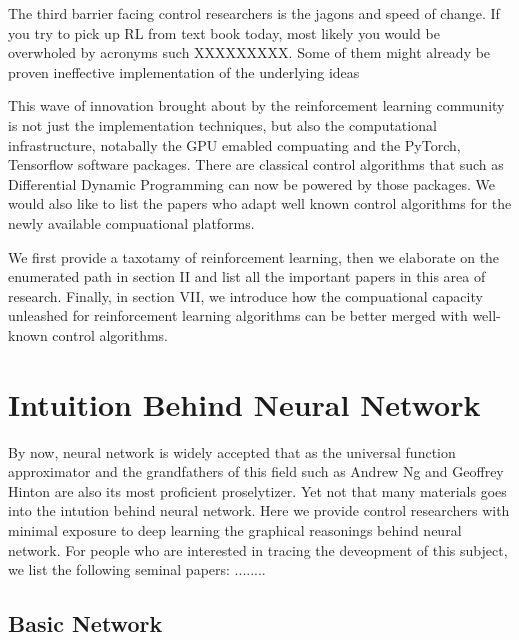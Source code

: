 \documentclass[journal]{IEEEtran}
\begin{document}
The third barrier facing control researchers is the jagons and speed of change. If you try to pick up RL from text book today, most likely you would be overwholed by acronyms such XXXXXXXXX. Some of them might already be proven ineffective implementation of the underlying ideas

This wave of innovation brought about by the reinforcement learning community is not just the implementation techniques, but also the computational infrastructure, notabally the GPU emabled compuating and the PyTorch, Tensorflow software packages. There are classical control algorithms that such as Differential Dynamic Programming can now be powered by those packages. We would also like to list the papers who adapt well known control algorithms for the newly available compuational platforms.

We first provide a taxotamy of reinforcement learning, then we elaborate on the enumerated path in section II and list all the important papers in this area of research. Finally, in section VII, we introduce how the compuational capacity unleashed for reinforcement learning algorithms can be better merged with well-known control algorithms.


\section{Intuition Behind Neural Network}
By now, neural network is widely accepted that as the universal function approximator \cite{Hornik1991ApproximationCO} and the grandfathers of this field such as Andrew Ng and Geoffrey Hinton are also its most proficient proselytizer. Yet not that many materials goes into the intution behind neural network. Here we provide control researchers with minimal exposure to deep learning the graphical reasonings behind neural network. For people who are interested in tracing the deveopment of this subject, we list the following seminal papers: \cite{Schwartz1989TheNC} \cite{Hornik1989MultilayerFN}........

\subsection{Basic Network}
\end{document}
